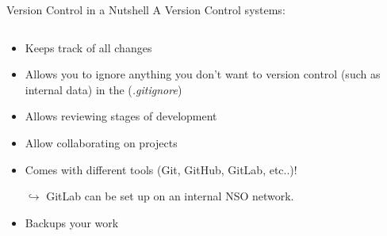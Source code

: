 \documentclass[xcolor=x11names,compress]{beamer}
\renewcommand{\(}{\begin{columns}}
\renewcommand{\)}{\end{columns}}
\newcommand{\<}[1]{\begin{column}{#1}}
\renewcommand{\>}{\end{column}}
\begin{document}
\begin{frame}{Version Control in a Nutshell }
A Version Control systems:
\begin{columns}[t]
\begin{column}{0.8\textwidth}
\begin{itemize}[<+->]
    \item Keeps track of all changes
    \item Allows you to ignore anything you don't want to version control (such as internal data) in the (\emph{.gitignore})
    \item Allows reviewing stages of development
    \item Allow collaborating on projects
    \item Comes with different tools (Git, GitHub, GitLab, etc..)! 
    \item[$\hookrightarrow$]  GitLab can be set up on an internal NSO network.
    \item Backups your work
  \end{itemize}
 \end{column}
  \begin{column}{0.2\textwidth}
    \begin{center}
    \begin{itemize}
    \end{itemize}
    \end{center}
  \end{column}
\end{columns}
\end{frame}
\end{document}
